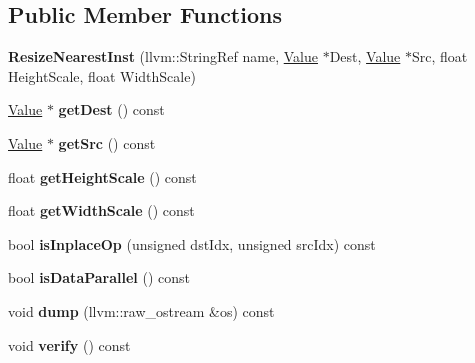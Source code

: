 \subsection*{Public Member Functions}
\begin{DoxyCompactItemize}
\item 
\mbox{\label{classglow_1_1_resize_nearest_inst_aca92003ab3c54d14d4044d8a5a70d81e}} 
{\bfseries Resize\+Nearest\+Inst} (llvm\+::\+String\+Ref name, \hyperlink{classglow_1_1_value}{Value} $\ast$Dest, \hyperlink{classglow_1_1_value}{Value} $\ast$Src, float Height\+Scale, float Width\+Scale)
\item 
\mbox{\label{classglow_1_1_resize_nearest_inst_a90c5bb914c61689e8667bcba0a50a84d}} 
\hyperlink{classglow_1_1_value}{Value} $\ast$ {\bfseries get\+Dest} () const
\item 
\mbox{\label{classglow_1_1_resize_nearest_inst_a9927cd1163526da98bcd6701b2f3c534}} 
\hyperlink{classglow_1_1_value}{Value} $\ast$ {\bfseries get\+Src} () const
\item 
\mbox{\label{classglow_1_1_resize_nearest_inst_a607679f74dbb2c612e7f6bae2f5fb2cc}} 
float {\bfseries get\+Height\+Scale} () const
\item 
\mbox{\label{classglow_1_1_resize_nearest_inst_adadca7658e950f4cf1ac7c61aed8bb57}} 
float {\bfseries get\+Width\+Scale} () const
\item 
\mbox{\label{classglow_1_1_resize_nearest_inst_af054fc9049d2d8edd76d2ca7ec16e512}} 
bool {\bfseries is\+Inplace\+Op} (unsigned dst\+Idx, unsigned src\+Idx) const
\item 
\mbox{\label{classglow_1_1_resize_nearest_inst_a775b0169175157054b277da90cac2584}} 
bool {\bfseries is\+Data\+Parallel} () const
\item 
\mbox{\label{classglow_1_1_resize_nearest_inst_aa89c63e457d38d561b2bbd425d0abbc7}} 
void {\bfseries dump} (llvm\+::raw\+\_\+ostream \&os) const
\item 
\mbox{\label{classglow_1_1_resize_nearest_inst_a5fda9531ad14e3a8798ba05f3bcadc54}} 
void {\bfseries verify} () const
\end{DoxyCompactItemize}
